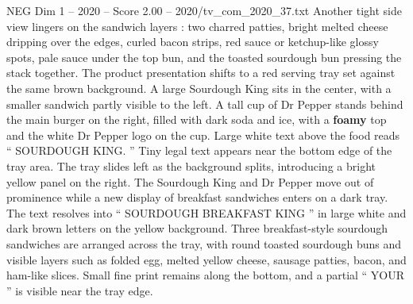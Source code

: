 \begin{textsample}{NEG Dim 1 – 2020 – Score 2.00 – 2020/tv\_com\_2020\_37.txt}
Another tight side view lingers on the sandwich layers : two charred patties, bright melted cheese dripping over the edges, curled bacon strips, red sauce or ketchup-like glossy spots, pale sauce under the top bun, and the toasted sourdough bun pressing the stack together.
The product presentation shifts to a red serving tray set against the same brown background.
A large Sourdough King sits in the center, with a smaller sandwich partly visible to the left.
A tall cup of Dr Pepper stands behind the main burger on the right, filled with dark soda and ice, with a \textbf{foamy} top and the white Dr Pepper logo on the cup.
Large white text above the food reads “ SOURDOUGH KING. ” Tiny legal text appears near the bottom edge of the tray area.
The tray slides left as the background splits, introducing a bright yellow panel on the right.
The Sourdough King and Dr Pepper move out of prominence while a new display of breakfast sandwiches enters on a dark tray.
The text resolves into “ SOURDOUGH BREAKFAST KING ” in large white and dark brown letters on the yellow background.
Three breakfast-style sourdough sandwiches are arranged across the tray, with round toasted sourdough buns and visible layers such as folded egg, melted yellow cheese, sausage patties, bacon, and ham-like slices.
Small fine print remains along the bottom, and a partial “ YOUR ” is visible near the tray edge.

\end{textsample}

